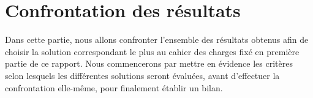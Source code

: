 \section{Confrontation des résultats}

Dans cette partie, nous allons confronter l'ensemble des résultats obtenus afin de choisir la solution correspondant le plus au cahier des charges fixé en première partie de ce rapport. Nous commencerons par mettre en évidence les critères selon lesquels les différentes solutions seront évaluées, avant d'effectuer la confrontation elle-même, pour finalement établir un bilan.





\pagebreak